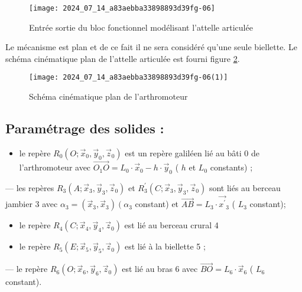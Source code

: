 \begin{figure}[!h]\centering
\texttt{[image: 2024\_07\_14\_a83aebba33898893d39fg-06]}

\caption{\label{fig:ccs_mp_2024:fig:09}Entrée sortie du bloc fonctionnel modélisant l'attelle articulée}
\end{figure}
Le mécanisme est plan et de ce fait il ne sera considéré qu'une seule biellette. Le schéma cinématique plan de l'attelle articulée est fourni figure \ref{fig:ccs_mp_2024:fig:10}.

\begin{figure}[!h]\centering
\texttt{[image: 2024\_07\_14\_a83aebba33898893d39fg-06(1)]}

\caption{\label{fig:ccs_mp_2024:fig:10}Schéma cinématique plan de l'arthromoteur}
\end{figure}

\subsection*{Paramétrage des solides :}
\begin{itemize}
  \item le repère $R_{0}\left(O ; \vec{x}_{0}, \vec{y}_{0}, \vec{z}_{0}\right)$ est un repère galiléen lié au bâti 0 de l'arthromoteur avec $\overrightarrow{O_{1} O}=L_{0} \cdot \vec{x}_{0}-h \cdot \vec{y}_{0}$ ( $h$ et $L_{0}$ constants) ;
\end{itemize}

— les repères $R_{3}\left(A ; \vec{x}_{3}, \vec{y}_{3}, \vec{z}_{0}\right)$ et $R_{3}^{\prime}\left(C ; \vec{x}_{3}, \vec{y}_{3}, \vec{z}_{0}\right)$ sont liés au berceau jambier 3 avec $\alpha_{3}=\left(\vec{x}_{3}, \vec{x}_{3}\right)\left(\alpha_{3}\right.$ constant) et $\overrightarrow{A B}=L_{3} \cdot \overrightarrow{x^{\prime}}{ }_{3}$ ( $L_{3}$ constant);

\begin{itemize}
  \item le repère $R_{4}\left(C ; \vec{x}_{4}, \vec{y}_{4}, \vec{z}_{0}\right)$ est lié au berceau crural 4

  \item le repère $R_{5}\left(E ; \vec{x}_{5}, \vec{y}_{5}, \vec{z}_{0}\right)$ est lié à la biellette 5 ;

\end{itemize}

— le repère $R_{6}\left(O ; \vec{x}_{6}, \vec{y}_{6}, \vec{z}_{0}\right)$ est lié au bras 6 avec $\overrightarrow{B O}=L_{6} \cdot \vec{x}_{6}$ ( $L_{6}$ constant).

